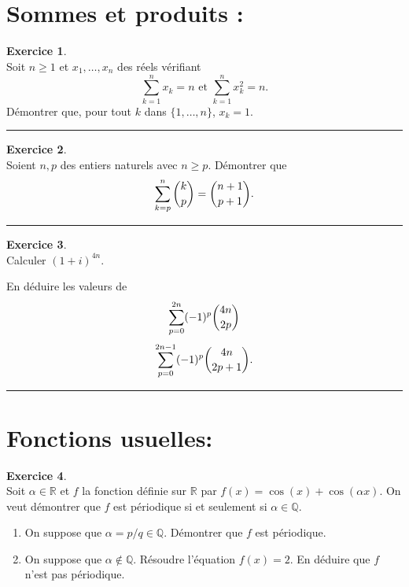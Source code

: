 \documentclass[a4paper,11pt]{article}
\theoremstyle{definition}
\newtheorem{exo}{Exercice} %
\begin{document}
\hfill\\\hfill\\
\begin{minipage}{1\linewidth}
	\begin{minipage}[t]{0.48\linewidth}
		\raggedright
		
	\section*{Sommes et produits :}%
\begin{exo}\textit{}\quad\\[0.25cm]
	Soit $n\geq 1$ et $x_1,\dots,x_n$ des réels vérifiant 
	$$\sum_{k=1}^n x_k=n\textrm{ et }\sum_{k=1}^n x_k^2=n.$$
	Démontrer que, pour tout $k$ dans $\{1,\dots,n\}$, $x_k=1$.
	
	
	\centering
	\rule{1\linewidth}{0.6pt}
\end{exo}



\begin{exo}\textit{}\quad\\
	Soient $n,p$ des entiers naturels avec $n\geq p$. Démontrer que
	$$\sum_{k=p}^n \dbinom{k}{p}=\dbinom{n+1}{p+1}.$$
	
	\centering
	\rule{1\linewidth}{0.6pt}
\end{exo}

\begin{exo}\quad\\
	Calculer $(1+i)^{4n}$. 
	
	En déduire les valeurs de 
	$$\sum_{p=0}^{2n}(-1)^p \dbinom{4n}{2p}$$
	$$\sum_{p=0}^{2n-1}(-1)^p \dbinom{4n}{2p+1}.$$
	
	\centering
	\rule{1\linewidth}{0.6pt}
\end{exo}
		
	\end{minipage}	
	\hfill\vrule\hfill
	\begin{minipage}[t]{0.48\linewidth}
		\raggedright
	\section*{Fonctions usuelles:}
		\begin{exo}\textit{ }\quad\\[0.25cm]
		Soit $\alpha\in\mathbb R$ et $f$ la fonction définie sur $\mathbb R$ par $f(x)=\cos(x)+\cos(\alpha x)$. On veut démontrer que $f$ est périodique si et seulement si $\alpha\in\mathbb Q$.
		\begin{enumerate}
			\item On suppose que $\alpha=p/q\in\mathbb Q$. Démontrer que $f$ est périodique.
			\item On suppose que $\alpha\notin\mathbb Q$. Résoudre l'équation $f(x)=2$. En déduire que $f$ n'est pas périodique.
		\end{enumerate}
	

\end{exo}
\end{minipage}
\end{minipage}
\end{document}
